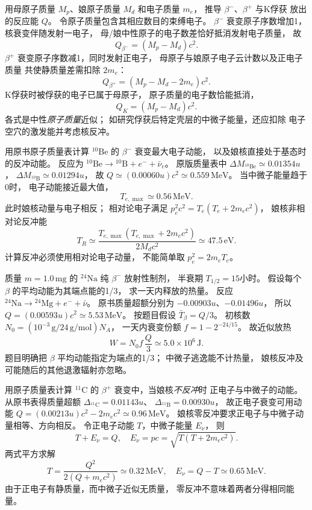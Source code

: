 用母原子质量 $M_p$、娘原子质量 $M_d$
和电子质量 $m_e$，
推导 $\beta^-$、$\beta^+$ 与K俘获
放出的反应能 $Q$。
\exsolution
令原子质量包含其相应数目的束缚电子。
$\beta^-$ 衰变原子序数增加1，
核衰变伴随发射一电子，
母/娘中性原子的电子数差恰好抵消发射电子质量，
故
\[
 \boxed{Q_{\beta^-}=(M_p-M_d)c^2}.
\]
$\beta^+$ 衰变原子序数减1，同时发射正电子，
母原子与娘原子电子云计数以及正电子质量
共使静质量差需扣除 $2m_e$：
\[
 \boxed{Q_{\beta^+}=(M_p-M_d-2m_e)c^2}.
\]
K俘获时被俘获的电子已属于母原子，
原子质量的电子数恰能抵消，
\[
 \boxed{Q_{K}=(M_p-M_d)c^2}.
\]
\excheck 各式是中性\emph{原子质量}近似；
如研究俘获后特定壳层的中微子能量，还应扣除
电子空穴的激发能并考虑核反冲。

用原书原子质量表计算
$\mathrm{^{10}Be}$ 的 $\beta^-$ 衰变最大电子动能，
以及娘核直接处于基态时的反冲动能。
\exsolution
反应为
$\mathrm{^{10}Be}\to\mathrm{^{10}B}+e^-+\bar\nu_e$。
原版质量表中
$\Delta M_{\mathrm{^{10}Be}}\simeq0.01354u$，
$\Delta M_{\mathrm{^{10}B}}\simeq0.01294u$，
故
$Q\simeq(0.00060u)c^2\simeq0.559\,\mathrm{MeV}$。
当中微子能量趋于0时，
电子动能接近最大值，
\[
 \boxed{T_{e,\max}\simeq0.56\,\mathrm{MeV}}.
\]
此时娘核动量与电子相反；
相对论电子满足
$p_e^2c^2=T_e(T_e+2m_ec^2)$，
娘核非相对论反冲能
\[
 \boxed{T_R\simeq
 \frac{T_{e,\max}(T_{e,\max}+2m_ec^2)}
 {2M_dc^2}\simeq47.5\,\mathrm{eV}}.
\]
\excheck 计算反冲必须使用相对论电子动量，
不能简单取 $p_e^2=2m_eT_e$。

质量 $m=1.0\,\mathrm{mg}$ 的
$\mathrm{^{24}Na}$ 纯 $\beta^-$ 放射性制剂，
半衰期 $T_{1/2}=15$小时。
假设每个 $\beta$ 的平均动能为其端点能的1/3，
求一天内释放的热量。
\exsolution
反应
$\mathrm{^{24}Na}\to\mathrm{^{24}Mg}+e^-+\bar\nu$。
原书质量超额分别为
$-0.00903u$、$-0.01496u$，
所以
$Q=(0.00593u)c^2\simeq5.53\,\mathrm{MeV}$。
按题目假设
$\bar T_\beta=Q/3$。
初核数
$N_0=(10^{-3}\,\mathrm g/24\,\mathrm{g/mol})N_A$，
一天内衰变份额
$f=1-2^{-24/15}$。
故近似放热
\[
 \boxed{W=N_0 f\,\frac Q3
 \simeq5.0\times10^6\,\mathrm J}.
\]
\excheck 题目明确把 $\beta$ 平均动能指定为端点的1/3；
中微子逃逸能不计热量，
娘核反冲及可能随后的其他退激辐射亦忽略。

用原子质量表计算 $\mathrm{^{11}C}$ 的
$\beta^+$ 衰变中，当娘核\emph{不反冲}时
正电子与中微子的动能。
\exsolution
从原书表得质量超额
$\Delta_{\mathrm{^{11}C}}=0.01143u$、
$\Delta_{\mathrm{^{11}B}}=0.00930u$，
故正电子衰变可用动能
$Q=(0.00213u)c^2-2m_ec^2\simeq0.96\,\mathrm{MeV}$。
娘核零反冲要求正电子与中微子动量相等、方向相反。
令正电子动能 $T$，中微子能量 $E_\nu$，
则
\[
 T+E_\nu=Q,\quad
 E_\nu=pc=\sqrt{T(T+2m_ec^2)}.
\]
两式平方求解
\[
 \boxed{T=\frac{Q^2}{2(Q+m_ec^2)}
 \simeq0.32\,\mathrm{MeV}},
 \quad
 \boxed{E_\nu=Q-T\simeq0.65\,\mathrm{MeV}}.
\]
\excheck 由于正电子有静质量，而中微子近似无质量，
零反冲不意味着两者分得相同能量。

